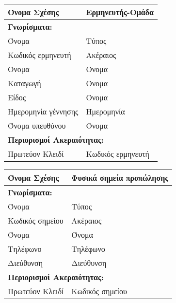 \begin{tabular}{|p{6cm}|p{8cm}|}
  \hline
  Όνομα Σχέσης        & Ερμηνευτής-Ομάδα                   \\ \hline
  \multicolumn{2}{|l|}{\textbf{Γνωρίσματα:}}               \\ \hline
  Όνομα               & Τύπος                              \\ \hline
  Κωδικός ερμηνευτή   & Ακέραιος                           \\ \hline
  Όνομα               & Όνομα                              \\ \hline
  Καταγωγή            & Όνομα                              \\ \hline
  Είδος               & Όνομα                              \\ \hline
  Ημερομηνία γέννησης & Ημερομηνία                         \\ \hline
  Όνομα υπευθύνου     & Όνομα                              \\ \hline
  \multicolumn{2}{|l|}{\textbf{Περιορισμοί Ακεραιότητας:}} \\ \hline
  Πρωτεύον Κλειδί     & Κωδικός ερμηνευτή                  \\ \hline
\end{tabular}


\begin{tabular}{|p{6cm}|p{8cm}|}
  \hline
  Όνομα Σχέσης    & Φυσικά σημεία προπώλησης               \\ \hline
  \multicolumn{2}{|l|}{\textbf{Γνωρίσματα:}}               \\ \hline
  Όνομα           & Τύπος                                  \\ \hline
  Κωδικός σημείου & Ακέραιος                               \\ \hline
  Όνομα           & Όνομα                                  \\ \hline
  Τηλέφωνο        & Τηλέφωνο                               \\ \hline
  Διεύθυνση       & Διεύθυνση                              \\ \hline
  \multicolumn{2}{|l|}{\textbf{Περιορισμοί Ακεραιότητας:}} \\ \hline
  Πρωτεύον Κλειδί & Κωδικός σημείου                        \\ \hline
\end{tabular}


